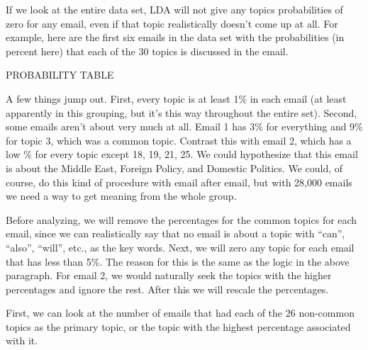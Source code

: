 \documentclass[12pt]{article}
\theoremstyle{definition}
\theoremstyle{algodesc}
\begin{document}
If we look at the entire data set, LDA will not give any topics probabilities of zero for any email, even if that topic realistically doesn't come up at all.  For example, here are the first six emails in the data set with the probabilities (in percent here) that each of the 30 topics is discussed in the email.

PROBABILITY TABLE

A few things jump out.  First, every topic is at least 1\% in each email (at least apparently in this grouping, but it's this way throughout the entire set).  Second, some emails aren't about very much at all.  Email 1 has 3\% for everything and 9\% for topic 3, which was a common topic.  Contrast this with email 2, which has a low \% for every topic except 18, 19, 21, 25.  We could hypothesize that this email is about the Middle East, Foreign Policy, and Domestic Politics.  We could, of course, do this kind of procedure with email after email, but with 28,000 emails we need a way to get meaning from the whole group.

Before analyzing, we will remove the percentages for the common topics for each email, since we can realistically say that no email is about a topic with ``can'', ``also'', ``will'', etc., as the key words.  Next, we will zero any topic for each email that has less than 5\%.  The reason for this is the same as the logic in the above paragraph.  For email 2, we would naturally seek the topics with the higher percentages and ignore the rest.  After this we will rescale the percentages.

First, we can look at the number of emails that had each of the 26 non-common topics as the primary topic, or the topic with the highest percentage associated with it.
\end{document}
